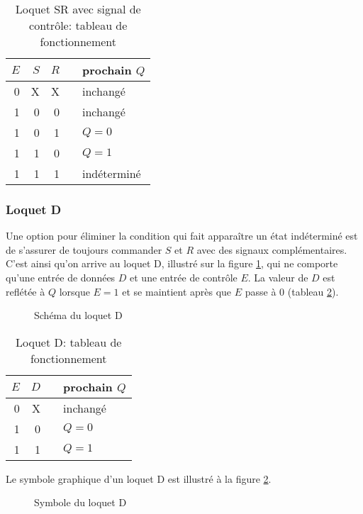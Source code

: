 \documentclass[11pt]{article}
\begin{document}
\begin{table}[htbp]
\caption{\label{tab:org56d58a3}Loquet SR avec signal de contrôle: tableau de fonctionnement}
\centering
\begin{tabular}{rrrll}
\(E\) & \(S\) & \(R\) &  & prochain \(Q\)\\
\hline
0 & X & X &  & inchangé\\
1 & 0 & 0 &  & inchangé\\
1 & 0 & 1 &  & \(Q = 0\)\\
1 & 1 & 0 &  & \(Q = 1\)\\
1 & 1 & 1 &  & indéterminé\\
\end{tabular}
\end{table}

\subsubsection{Loquet D}
\label{sec:org73a9250}
Une option pour éliminer la condition qui fait apparaître un état
indéterminé est de s'assurer de toujours commander \(S\) et \(R\)
avec des signaux complémentaires. C'est ainsi qu'on arrive au loquet
D, illustré sur la figure \ref{fig:orgfd63f3e}, qui ne comporte qu'une entrée de
données \(D\) et une entrée de contrôle \(E\). La valeur de \(D\) est
reflétée à \(Q\) lorsque \(E=1\) et se maintient après que \(E\) passe
à 0 (tableau \ref{tab:org4e3c4e2}).

\begin{figure}[htbp]
\centering

\caption{\label{fig:orgfd63f3e}Schéma du loquet D}
\end{figure}

\begin{table}[htbp]
\caption{\label{tab:org4e3c4e2}Loquet D: tableau de fonctionnement}
\centering
\begin{tabular}{rrll}
\(E\) & \(D\) &  & prochain \(Q\)\\
\hline
0 & X &  & inchangé\\
1 & 0 &  & \(Q = 0\)\\
1 & 1 &  & \(Q = 1\)\\
\end{tabular}
\end{table}

Le symbole graphique d'un loquet D est illustré à la figure \ref{fig:org0151733}.

\begin{figure}[htbp]
\centering

\caption{\label{fig:org0151733}Symbole du loquet D}
\end{figure}
\end{document}

